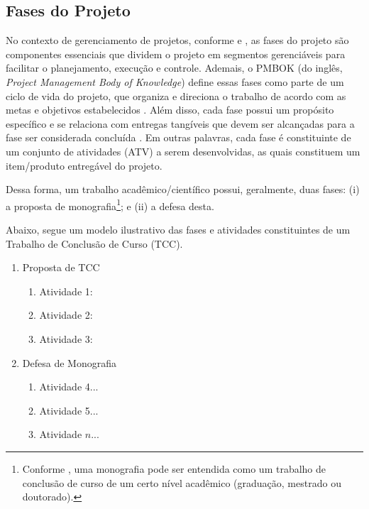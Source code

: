 \subsection{Fases do Projeto}\label{sec:fases_projeto}

No contexto de gerenciamento de projetos, conforme  e , as fases do projeto são componentes essenciais que dividem o projeto em segmentos gerenciáveis para facilitar o planejamento, execução e controle. Ademais, o PMBOK (do inglês, \textit{Project Management Body of Knowledge}) define essas fases como parte de um ciclo de vida do projeto, que organiza e direciona o trabalho de acordo com as metas e objetivos estabelecidos \cite{Anunciacao2020,Ramos2020}. Além disso, cada fase possui um propósito específico e se relaciona com entregas tangíveis que devem ser alcançadas para a fase ser considerada concluída \cite{PMBOK2021}. Em outras palavras, cada fase é constituinte de um conjunto de atividades (ATV) a serem desenvolvidas, as quais constituem um item/produto entregável do projeto.

Dessa forma, um trabalho acadêmico/científico possui, geralmente, duas fases: (i) a proposta de monografia\footnote{Conforme , uma monografia pode ser entendida como um trabalho de conclusão de curso de um certo nível acadêmico (graduação, mestrado ou doutorado).}; e (ii) a defesa desta.

\newpage

Abaixo, segue um modelo ilustrativo das fases e atividades constituintes de um Trabalho de Conclusão de Curso (TCC).
\begin{enumerate}[label=\textbf{Fase \arabic*:}, nosep, leftmargin=3.5cm]
    \item Proposta de TCC
        \begin{enumerate}[resume, label=\textbf{ATV \arabic*)}, nosep]
            \item Atividade 1: \lipsum[1]
            \item Atividade 2: \lipsum[2]
            \item Atividade 3: \lipsum[3]
        \end{enumerate}

\newpage

    \item Defesa de Monografia
        \begin{enumerate}[resume, label=\textbf{ATV \arabic*)}, nosep]
            \item Atividade 4...
            \item Atividade 5...
            \item Atividade $n$...
        \end{enumerate}
\end{enumerate}